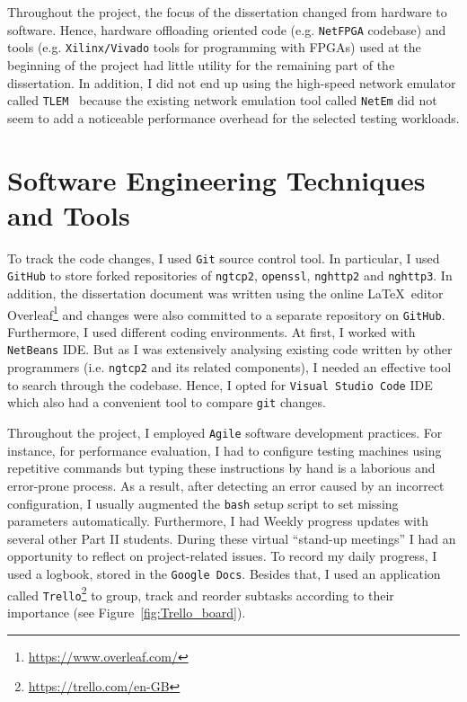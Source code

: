 \documentclass[12pt,a4paper,twoside,openright]{report}
\begin{document}
Throughout the project, the focus of the dissertation changed from hardware to software.
Hence, hardware offloading oriented code (e.g. \texttt{NetFPGA} codebase) and tools (e.g. \texttt{Xilinx/Vivado} tools for programming with FPGAs) used at the beginning of the project had little utility for the remaining part of the dissertation.
In addition, I did not end up using the high-speed network emulator called \texttt{TLEM}~\cite{TLEM_tool} because the existing network emulation tool called \texttt{NetEm} did not seem to add a noticeable performance overhead for the selected testing workloads.


\section{Software Engineering Techniques and Tools} \label{Software_Engineering_Techniques_and_Tools}
    To track the code changes, I used \texttt{Git} source control tool.
    In particular, I used \texttt{GitHub} to store forked repositories of \texttt{ngtcp2}, \texttt{openssl}, \texttt{nghttp2} and \texttt{nghttp3}.
    In addition, the dissertation document was written using the online \LaTeX\  editor Overleaf\footnote{\url{https://www.overleaf.com/}} and changes were also committed to a separate repository on \texttt{GitHub}.
    Furthermore, I used different coding environments.
    At first, I worked with \texttt{NetBeans} IDE.
    But as I was extensively analysing existing code written by other programmers (i.e. \texttt{ngtcp2} and its related components), I needed an effective tool to search through the codebase.
    Hence, I opted for \texttt{Visual Studio Code} IDE which also had a convenient tool to compare \texttt{git} changes.
    
    
    Throughout the project, I employed \texttt{Agile} software development practices.
    For instance, for performance evaluation, I had to configure testing machines using repetitive commands but typing these instructions by hand is a laborious and error-prone process.
    As a result, after detecting an error caused by an incorrect configuration, I usually augmented the \texttt{bash} setup script to set missing parameters automatically.
    Furthermore, I had Weekly progress updates with several other Part II students.
    During these virtual \enquote{stand-up meetings} I had an opportunity to reflect on project-related issues.
    To record my daily progress, I used a logbook, stored in the \texttt{Google Docs}.
    Besides that, I used an application called \texttt{Trello}\footnote{\url{https://trello.com/en-GB}} to group, track and reorder subtasks according to their importance (see Figure~\ref{fig:Trello_board}).
\end{document}
